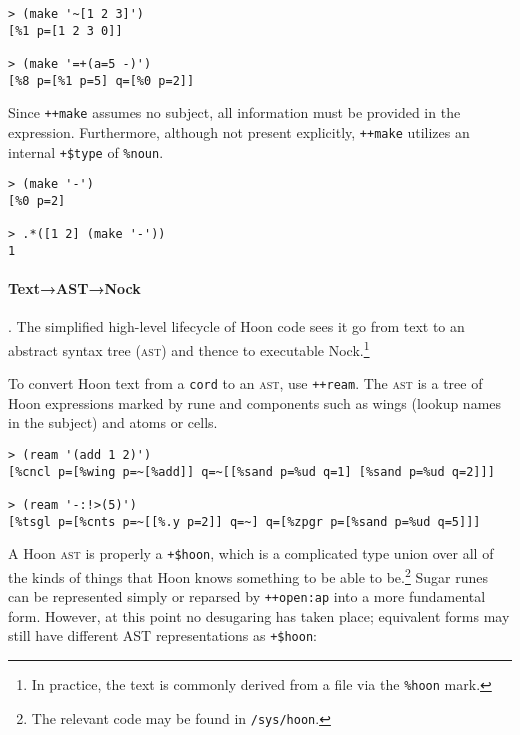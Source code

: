 \documentclass[twoside]{article}
\begin{document}
\begin{lstlisting}[style=listingcode]
> (make '~[1 2 3]')
[%1 p=[1 2 3 0]]

> (make '=+(a=5 -)')
[%8 p=[%1 p=5] q=[%0 p=2]]
\end{lstlisting}

\noindent
Since \lstinline[style=inlinecode]{++make} assumes no subject, all information must be provided in the expression.  Furthermore, although not present explicitly, \lstinline[style=inlinecode]{++make} utilizes an internal \lstinline[style=inlinecode]{+$type} of \lstinline[style=inlinecode]{%noun}.

\begin{lstlisting}[style=listingcode]
> (make '-')
[%0 p=2]

> .*([1 2] (make '-'))
1
\end{lstlisting}

\paragraph{Text→AST→Nock}.  The simplified high-level lifecycle of Hoon code sees it go from text to an abstract syntax tree (\textsc{ast}) and thence to executable Nock.\footnote{In practice, the text is commonly derived from a file via the \lstinline[style=inlinecode]{%hoon} mark.}

To convert Hoon text from a \lstinline[style=inlinecode]{cord} to an \textsc{ast}, use \lstinline[style=inlinecode]{++ream}.  The \textsc{ast} is a tree of Hoon expressions marked by rune and components such as wings (lookup names in the subject) and atoms or cells.

\begin{lstlisting}[style=listingcode]
> (ream '(add 1 2)')
[%cncl p=[%wing p=~[%add]] q=~[[%sand p=%ud q=1] [%sand p=%ud q=2]]]

> (ream '-:!>(5)')  
[%tsgl p=[%cnts p=~[[%.y p=2]] q=~] q=[%zpgr p=[%sand p=%ud q=5]]]
\end{lstlisting}

\noindent
A Hoon \textsc{ast} is properly a \lstinline[style=inlinecode]{+$hoon}, which is a complicated type union over all of the kinds of things that Hoon knows something to be able to be.\footnote{The relevant code may be found in \lstinline[style=inlinecode]{/sys/hoon}.}  Sugar runes can be represented simply or reparsed by \lstinline[style=inlinecode]{++open:ap} into a more fundamental form.  However, at this point no desugaring has taken place; equivalent forms may still have different AST representations as \lstinline[style=inlinecode]{+$hoon}:
\end{document}
